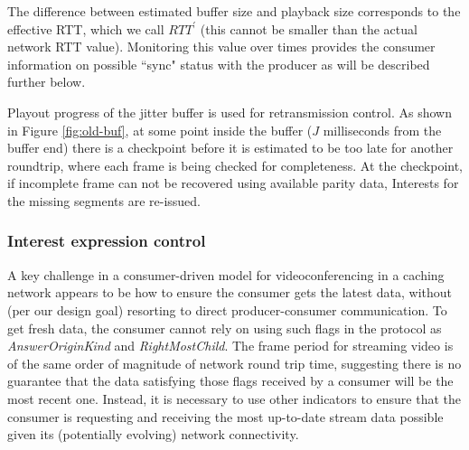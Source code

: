 \documentclass{icn/sig-alternate-2013} %
\begin{document}
The difference between estimated buffer size and playback size corresponds to the effective RTT, which we call $RTT^{\prime}$ (this cannot be smaller than the actual network RTT value). %
Monitoring this value over times provides the consumer information on possible ``sync" status with the producer as will be described further below. %

Playout progress of the jitter buffer is used for retransmission control. As shown in Figure \ref{fig:old-buf}, at some point inside the buffer ($J$ milliseconds from the buffer end) there is a checkpoint before it is estimated to be too late for another roundtrip, where each frame is being checked for completeness. At the checkpoint, if incomplete frame can not be recovered using available parity data, Interests for the missing segments are re-issued. 

\subsubsection{Interest expression control}


A key challenge in a consumer-driven model for videoconferencing in a caching network appears to be how to ensure the consumer gets the latest data, without (per our design goal) resorting to direct producer-consumer communication.
To get fresh data, the consumer cannot rely on using such flags in the protocol as \textit{AnswerOriginKind} and \textit{RightMostChild}. The frame period for  streaming video is of the same order of magnitude of network round trip time, suggesting there is no guarantee that the data satisfying those flags received by a consumer will be the most recent one. Instead, it is necessary to use other indicators to ensure that the consumer is requesting and receiving the most up-to-date stream data possible given its (potentially evolving) network connectivity. 
\end{document}
